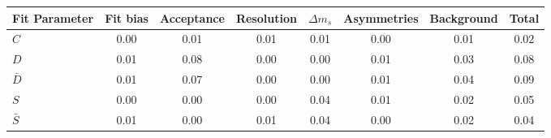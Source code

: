 \begin{tabular}{l  c  c  c  c  c  c  | c }
\hline
\hline
Fit Parameter & Fit bias & Acceptance & Resolution & $\Delta m_{s}$ & Asymmetries & Background &  Total  \\ 
\hline
$C$ & 0.00 & 0.01 & 0.01 & 0.01 & 0.00 & 0.01 & 0.02 \\ 
$D$ & 0.01 & 0.08 & 0.00 & 0.00 & 0.01 & 0.03 & 0.08 \\ 
$\bar{D}$ & 0.01 & 0.07 & 0.00 & 0.00 & 0.01 & 0.04 & 0.09 \\ 
$S$ & 0.00 & 0.00 & 0.00 & 0.04 & 0.01 & 0.02 & 0.05 \\ 
$\bar{S}$ & 0.01 & 0.00 & 0.01 & 0.04 & 0.00 & 0.02 & 0.04 \\ 
\hline
\hline
\end{tabular}
